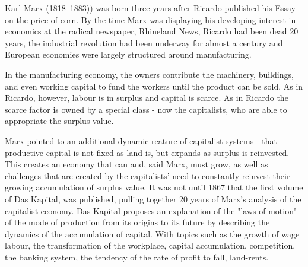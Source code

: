 Karl Marx (1818--1883)) was born three years after Ricardo published his Essay on the price of corn. 
By the time Marx was displaying  his developing interest in economics  at the radical newspaper, Rhineland News, Ricardo had been dead 20 years, the industrial revolution had been underway for almost a century and European economies were largely structured around manufacturing. 

 In the manufacturing economy, the owners contribute the machinery, buildings, and even working capital to fund the workers until the product can be sold. %
As in Ricardo, however, labour is in surplus and capital is scarce. As in Ricardo the scarce factor is owned by a special class - now the capitalists, who are able to appropriate the surplus value. %

Marx pointed to an additional dynamic reature of  capitalist systems - that productive capital is not fixed as land is, but  expands as surplus is reinvested. This creates an economy that can and, said Marx, must grow, as well as challenges that are created by the capitalists' need to constantly reinvest their growing accumulation of surplus value. It was not until 1867 that  the first volume of Das Kapital,  was published, pulling together 20 years of Marx's analysis of the capitalist economy.  Das Kapital proposes an explanation of the "laws of motion" of the mode of production from its origins to its future by describing the dynamics of the accumulation of capital. With topics such as the growth of wage labour, the transformation of the workplace, capital accumulation, competition, the banking system, the tendency of the rate of profit to fall, land-rents.%


